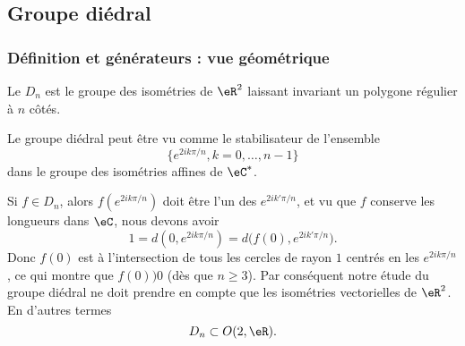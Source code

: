 \subsection{Groupe diédral}
\label{subsecHibJId}

\subsubsection{Définition et générateurs : vue géométrique}

\begin{definition}  \label{DEFooIWZGooAinSOh}
    Le  \( D_n\) est le groupe des isométries de \( \eR^2\) laissant invariant un polygone régulier à \( n\) côtés.
\end{definition}
Le groupe diédral peut être vu comme le stabilisateur de l'ensemble
\begin{equation}
    \{  e^{2ik\pi/n},k=0,\ldots, n-1 \}
\end{equation}
dans le groupe des isométries affines de \( \eC^*\).

Si \( f\in D_n\), alors \( f( e^{2ik\pi/n}) \) doit être l'un des \(  e^{2ik'\pi/n}\), et vu que \( f\) conserve les longueurs dans \( \eC\), nous devons avoir
\begin{equation}
    1=d(0, e^{2ik\pi/n})=d\big( f(0), e^{2ik'\pi/n} \big).
\end{equation}
Donc \( f(0)\) est à l'intersection de tous les cercles de rayon \( 1\) centrés en les \(  e^{2ik\pi/n}\), ce qui montre que \( f(0))0\) (dès que \( n\geq 3\)). Par conséquent notre étude du groupe diédral ne doit prendre en compte que les isométries vectorielles de \( \eR^2\). En d'autres termes
\begin{equation}
    D_n\subset O(2,\eR).
\end{equation}

